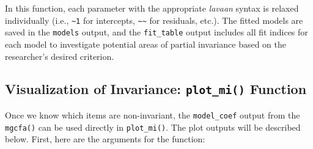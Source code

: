 \documentclass[
  man]{apa7}
\begin{document}
In this function, each parameter with the appropriate \emph{lavaan} syntax is relaxed individually (i.e., \texttt{\textasciitilde{}1} for intercepts, \texttt{\textasciitilde{}\textasciitilde{}} for residuals, etc.). The fitted models are saved in the \texttt{models} output, and the \texttt{fit\_table} output includes all fit indices for each model to investigate potential areas of partial invariance based on the researcher's desired criterion.

\subsection{\texorpdfstring{Visualization of Invariance: \texttt{plot\_mi()} Function}{Visualization of Invariance: plot\_mi() Function}}\label{visualization-of-invariance-plot_mi-function}

Once we know which items are non-invariant, the \texttt{model\_coef} output from the \texttt{mgcfa()} can be used directly in \texttt{plot\_mi()}. The plot outputs will be described below. First, here are the arguments for the function:
\end{document}
